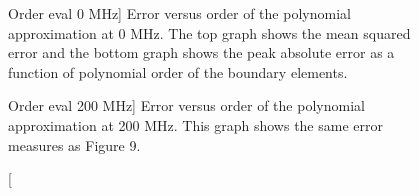 \documentclass [11 pt, titlepage]{article}
\begin{document}
\begin {figure}
\begin {minipage}[t]{3.0in}
    \begin {center}
     \caption
    [Order eval 0 MHz] {Error versus order of the polynomial
    approximation at 0 MHz.  The top graph shows the mean squared error and the
    bottom graph shows the peak absolute error as a function of
    polynomial order of the boundary elements.}
\end {center}
\end {minipage}\hfill
\begin {minipage}[t]{3.0in}
    \begin {center}
     \caption
    [Order eval 200 MHz] {Error versus order of the polynomial
    approximation at 200 MHz.  This graph shows the same error
    measures as Figure 9.}
    \end {center}
\end {minipage}
\end {figure}
\end{document}
